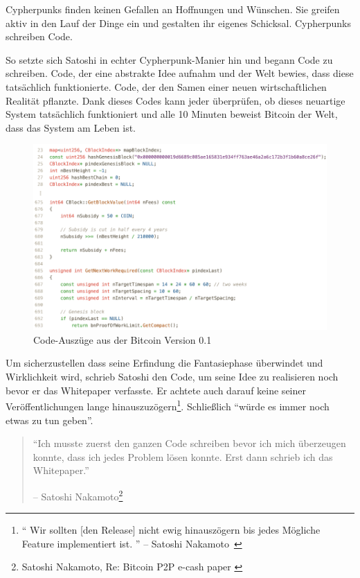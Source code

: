 Cypherpunks finden keinen Gefallen an Hoffnungen und Wünschen. Sie greifen aktiv
in den Lauf der Dinge ein und gestalten ihr eigenes Schicksal. Cypherpunks
schreiben Code.

So setzte sich Satoshi in echter Cypherpunk-Manier hin und begann Code zu
schreiben. Code, der eine abstrakte Idee aufnahm und der Welt bewies, dass diese
tatsächlich funktionierte. Code, der den Samen einer neuen wirtschaftlichen
Realität pflanzte. Dank dieses Codes kann jeder überprüfen, ob dieses neuartige
System tatsächlich funktioniert und alle 10 Minuten beweist Bitcoin der Welt,
dass das System am Leben ist.

\begin{figure}
  \includegraphics{assets/images/bitcoin-code-white.png}
  \caption{Code-Auszüge aus der Bitcoin Version 0.1}
  \label{fig:bitcoin-code-white}
\end{figure}

Um sicherzustellen dass seine Erfindung die Fantasiephase überwindet und
Wirklichkeit wird, schrieb Satoshi den Code, um seine Idee zu realisieren noch
bevor er das Whitepaper verfasste. Er achtete auch darauf keine seiner
Veröffentlichungen lange hinauszuzögern\footnote{\enquote{ Wir sollten [den
Release] nicht ewig hinauszögern bis jedes Mögliche Feature implementiert ist. }
-- Satoshi Nakamoto~\cite{satoshi-delay}}. Schließlich \enquote{würde es immer
noch etwas zu tun geben}.

\begin{quotation}\begin{samepage}
\enquote{Ich musste zuerst den ganzen Code schreiben bevor ich mich überzeugen konnte, dass ich jedes Problem lösen konnte.
Erst dann schrieb ich das Whitepaper.}
\begin{flushright} -- Satoshi Nakamoto\footnote{Satoshi Nakamoto, Re: Bitcoin P2P e-cash paper \cite{satoshi-mail-code-first}}
\end{flushright}\end{samepage}\end{quotation}

